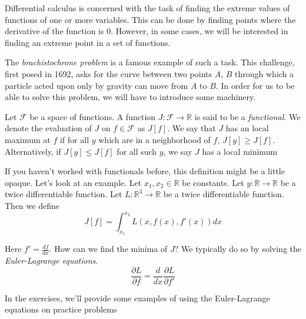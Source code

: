\documentclass[book.tex]{subfiles}
\begin{document}
Differential calculus is concerned with the task of finding the extreme values of functions of one or more variables. This can be done by finding points where the derivative of the function is 0. However, in some cases, we will be interested in finding an extreme point in a set of functions. 

The \textit{brachistochrone problem} is a famous example of such a task. This challenge, first posed in 1692, asks for the curve between two points $A$, $B$ through which a particle acted upon only by gravity can move from $A$ to $B$. In order for us to be able to solve this problem, we will have to introduce some machinery. 

Let $\mathcal{F}$ be a space of functions. A function $J: \mathcal{F} \to \mathbb{R}$ is said to be a \textit{functional}. We denote the evaluation of $J$ on $f \in \mathcal{F}$ as $J[f]$.  We say that $J$ has an local maximum at $f$ if for all $y$ which are in a neighborhood of $f$,  $J[y] \geq J[f]$. Alternatively, if $J[y] \leq J[f]$ for all such $y$, we say $J$ has a local minimum

If you haven't worked with functionals before, this definition might be a little opaque. Let's look at an example. Let $x_1, x_2 \in \mathbb{R}$ be constants. Let $y: \mathbb{R} \to \mathbb{R}$ be a twice differentiable function. Let $L: \mathbb{R}^3 \to \mathbb{R}$ be a twice differentiable function. Then we define
\begin{equation}
    J[f] = \int_{x_1}^{x_2} L(x, f(x), f'(x)) dx
\end{equation}

Here $f' = \frac{df}{dx}$. How can we find the minima of $J$? We typically do so by solving the \textit{Euler-Lagrange equations}.
\begin{equation}
    \frac{\partial L}{\partial f} = \frac{d}{dx} \frac{\partial L}{\partial f'}
\end{equation}

In the exercises, we'll provide some examples of using the Euler-Lagrange equations on practice problems

\end{document}
